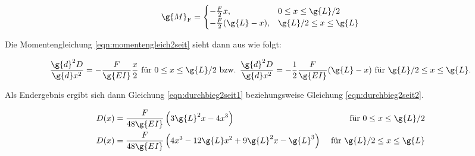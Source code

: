 \begin{equation}\label{eqn:halbaussenkraft}
  \g{M}_{\text{F}} =
  \begin{cases}
     -\frac{F}{2} x, & 0 \leq x \leq \g{L}/2\\
     -\frac{F}{2} (\g{L} - x), & \g{L}/2 \leq x \leq \g{L}
  \end{cases}
\end{equation}

Die Momentengleichung \eqref{eqn:momentengleich2seit} sieht dann aus
wie folgt:

\begin{equation}
  \frac{\g{d}^2 D}{\g{d}x^2} = -\frac{F}{\g{E I}}\frac{x}{2} \text{ für }
  0 \leq x \leq \g{L}/2 \text{ bzw. } \frac{\g{d}^2 D}{\g{d}x^2} = -
  \frac{1}{2}\frac{F}{\g{E I}}(\g{L} - x) \text{ für } \g{L}/2 \leq x \leq \g{L}.
  \label{eqn:momentengleich2seit}
\end{equation}

Als Endergebnis ergibt sich dann Gleichung \eqref{eqn:durchbieg2seit1}
beziehungsweise Gleichung \eqref{eqn:durchbieg2seit2}.

\begin{align}
  D(x) &= \frac{F}{48\g{E I}} \left( 3\g{L}^2 x - 4 x^3 \right)
  &\text{ für } 0 \leq x \leq \g{L}/2
  \label{eqn:durchbieg2seit1}\\
  D(x) &= \frac{F}{48\g{E I}} \left( 4 x^3 - 12 \g{L}x^2 + 9\g{L}^2 x - \g{L}^3 \right)
  &\text{ für } \g{L}/2 \leq x \leq \g{L}
  \label{eqn:durchbieg2seit2}
\end{align}
